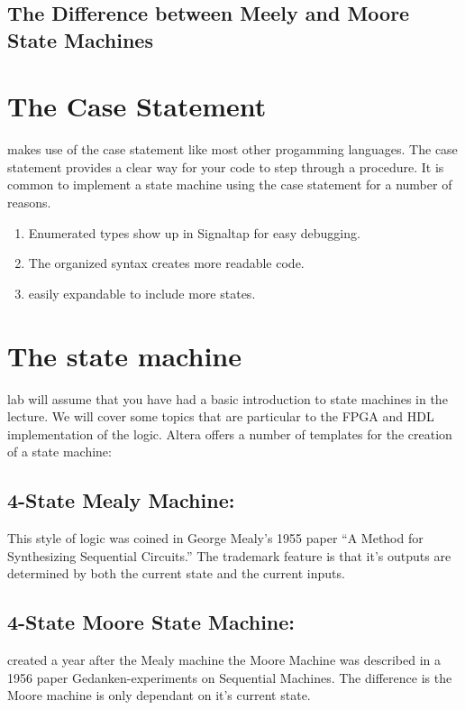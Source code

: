   \subsection{The Difference between Meely and Moore State Machines}

  \section{The Case Statement}
     makes use of the case statement like most other progamming languages. The case statement provides a clear way for your code to step through a procedure. It is common to implement a state machine using the case statement for a number of reasons.
    \begin{enumerate}
      \item Enumerated types show up in Signaltap for easy debugging.
      \item The organized syntax creates more readable code.
      \item easily expandable to include more states.
    \end{enumerate}

  \section{The state machine}
     lab will assume that you have had a basic introduction to state machines in the lecture. We will cover some topics that are particular to the FPGA and HDL implementation of the logic. Altera offers a number of templates for the creation of a state machine\cite{Altera:QuartusHandbook}:
      
      \subsection{4-State Mealy Machine:} This style of logic was coined in George Mealy's 1955 paper “A Method for Synthesizing Sequential Circuits.” The trademark feature is that it's outputs are determined by both the current state and the current inputs. \cite{Wikipedia:MealyMachine}
      
      \subsection{4-State Moore State Machine:} created a year after the Mealy machine the Moore Machine was described in a 1956 paper Gedanken-experiments on Sequential Machines. The difference is the Moore machine is only dependant on it's current state. \cite{Wikipedia:MooreMachine}
      
